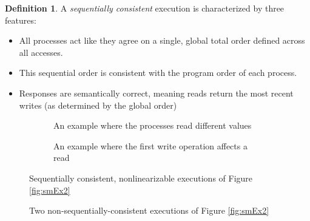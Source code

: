 \documentclass[]             %
{NASA}                       %
\theoremstyle{definition}
\newtheorem{definition}{Definition}[section]
\begin{document}
\begin{definition}
  \label{def:sequentiallyconsistent}
  A \emph{sequentially consistent} execution is
  characterized by three features:
  \begin{itemize}
  \item All processes act like they agree on a single, global total order
    defined across all accesses.
  \item This sequential order is consistent with the program order of each process.
  \item Responses are semantically correct, meaning reads return the most recent writes (as determined by the global order)
  \end{itemize}
\end{definition}

\begin{figure}[p]
  \setlength\belowcaptionskip{5ex}

  \begin{subfigure}{1\textwidth}
    \centering
    
    \caption{An example where the processes read different values}
    \label{fig:smEx1L1}
  \end{subfigure}

  \begin{subfigure}{1\textwidth}
    
    \caption{An example where the first write operation affects a read}
    \label{fig:smEx4S2}
  \end{subfigure}

  \caption{Sequentially consistent, nonlinearizable executions of Figure \ref{fig:smEx2}}
  \label{fig:smEx3}
\end{figure}

\begin{figure}[p]
  \setlength\belowcaptionskip{5ex}

  \begin{subfigure}{1\textwidth}
    \centering
    
    \caption{}
    \label{fig:smEx1L1}
  \end{subfigure}

  \begin{subfigure}{1\textwidth}
    
    \caption{}
    \label{fig:smEx4S2}
  \end{subfigure}

  \caption{Two non-sequentially-consistent executions of Figure \ref{fig:smEx2}}
  \label{fig:smEx3}
\end{figure}
\end{document}

